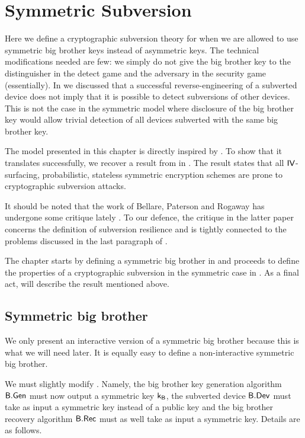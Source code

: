 \chapter{Symmetric Subversion}

Here we define a cryptographic subversion theory for when we are allowed to use symmetric big brother keys instead of asymmetric keys. The technical modifications needed are few: we simply do not give the big brother key to the distinguisher in the detect game and the adversary in the security game (essentially). In  we discussed that a successful reverse-engineering of a subverted device does not imply that it is possible to detect subversions of other devices. This is not the case in the symmetric model where disclosure of the big brother key would allow trivial detection of all devices subverted with the same big brother key. 

The model presented in this chapter is directly inspired by \cite{DBLP:secSym}. To show that it translates successfully, we recover a result from \cite{DBLP:secSym} in .  The result states that all $\mathsf{IV}$-surfacing, probabilistic, stateless symmetric encryption schemes are prone to cryptographic subversion attacks. 

It should be noted that the work of Bellare, Paterson and Rogaway \cite{DBLP:secSym} has undergone some critique lately \cite{JPB}. To our defence, the critique in the latter paper concerns the definition of subversion resilience and is tightly connected to the problems discussed in the last paragraph of .

The chapter starts by defining a symmetric big brother in  and proceeds to define the properties of a cryptographic subversion in the symmetric case in . As a final act,  will describe the result mentioned above. 

\section{Symmetric big brother}

We only present an interactive version of a symmetric big brother because this is what we will need later. It is equally easy to define a non-interactive symmetric big brother. 


We must slightly modify . Namely, the big brother key generation algorithm $\mathsf{B}.\mathsf{Gen}$ must now output a symmetric key $\mathsf{k}_{\mathsf{B}}$, the subverted device $\mathsf{B}.\mathsf{Dev}$ must take as input a symmetric key instead of a public key and the big brother recovery algorithm $\mathsf{B}.\mathsf{Rec}$ must as well take as input a symmetric key. Details are as follows.

